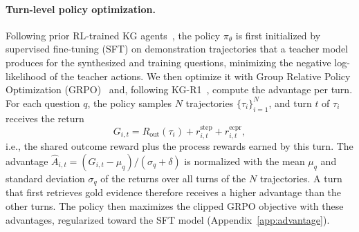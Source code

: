 \paragraph{Turn-level policy optimization.}
Following prior RL-trained KG agents~\citep{Plan-Then-retrieve,KnowCoder-A1,KBQA-R1}, the policy $\pi_{\theta}$ is first initialized by supervised fine-tuning (SFT) on demonstration trajectories that a teacher model produces for the synthesized and training questions, minimizing the negative log-likelihood of the teacher actions. We then optimize it with Group Relative Policy Optimization (GRPO)~\citep{GRPO} and, following KG-R1~\citep{KG-R1}, compute the advantage per turn. For each question $q$, the policy samples $N$ trajectories $\{\tau_i\}_{i=1}^{N}$, and turn $t$ of $\tau_i$ receives the return
\begin{equation}
\label{eq:turn_return}
    G_{i,t}
    =
    R_{\text{out}}(\tau_i)
    + r^{\text{step}}_{i,t}
    + r^{\text{ecpr}}_{i,t},
\end{equation}
i.e., the shared outcome reward plus the process rewards earned by this turn. The advantage $\hat{A}_{i,t}=(G_{i,t}-\mu_q)/(\sigma_q+\delta)$ is normalized with the mean $\mu_q$ and standard deviation $\sigma_q$ of the returns over all turns of the $N$ trajectories. A turn that first retrieves gold evidence therefore receives a higher advantage than the other turns. The policy then maximizes the clipped GRPO objective with these advantages, regularized toward the SFT model (Appendix~\ref{app:advantage}).
